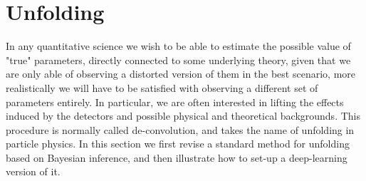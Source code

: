 \section{Unfolding}\label{intro:unfolding}

In any quantitative science we wish to be able to estimate the possible value of "true" parameters, directly connected to some underlying theory, given that we are only able of observing a distorted version of them in the best scenario, more realistically we will have to be satisfied with observing a different set of parameters entirely.
In particular, we are often interested in lifting the effects induced by the detectors and possible physical and theoretical backgrounds. This procedure is normally called de-convolution, and takes the name of unfolding in particle physics. In this section we first revise a standard method for unfolding based on Bayesian inference, and then illustrate how to set-up a deep-learning version of it.

